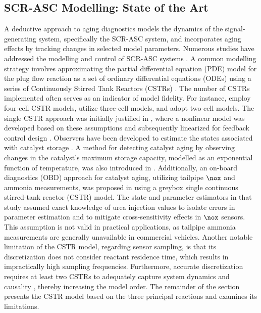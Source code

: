 \subsection{SCR-ASC Modelling: State of the Art}
A deductive approach to aging diagnostics models the dynamics of the signal-generating system, specifically the SCR-ASC
system, and incorporates aging effects by tracking changes in selected model parameters. Numerous studies have addressed
the modelling and control of SCR-ASC systems \cite{yuan2015diesel}. A common modelling strategy involves approximating
the partial differential equation (PDE) model for the plug flow reaction as a set of ordinary differential equations
(ODEs) using a series of Continuously Stirred Tank Reactors (CSTRs) \cite{hsieh2011development,nova2014urea}. The number
of CSTRs implemented often serves as an indicator of model fidelity. For instance,
\cite{chen2016estimation,ma2017observer,devarakonda2009model,hsieh2011development} employ four-cell CSTR models,
\cite{hu2018failure,hu2017improving,stadlbauer2015adaptive,schar2004control} utilize three-cell models, and
\cite{jiang2019hydrothermal,upadhyay2002modeling,devarakonda2008adequacy} adopt two-cell models. The single CSTR
approach was initially justified in \cite{devarakonda2008adequacy}, where a nonlinear model was developed based on these
assumptions and subsequently linearized for feedback control design \cite{devarakonda2009model}. Observers have been
developed to estimate the states associated with catalyst storage \cite{ma2017observer,jain2020term}. A method for
detecting catalyst aging by observing changes in the catalyst's maximum storage capacity, modelled as an exponential
function of temperature, was also introduced in \cite{ma2017observer,jiang2019hydrothermal}. Additionally, an on-board
diagnostics (OBD) approach for catalyst aging, utilizing tailpipe $\nox$ and ammonia measurements, was proposed in
\cite{jain2023diagnostics, jain2023model} using a greybox single continuous stirred-tank reactor (CSTR) model. The state
and parameter estimators in that study assumed exact knowledge of urea injection values to isolate errors in parameter
estimation and to mitigate cross-sensitivity effects in $\nox$ sensors. This assumption is not valid in practical
applications, as tailpipe ammonia measurements are generally unavailable in commercial vehicles. Another notable
limitation of the CSTR model, regarding sensor sampling, is that its discretization does not consider reactant residence
time, which results in impractically high sampling frequencies. Furthermore, accurate discretization requires at least
two CSTRs to adequately capture system dynamics and causality \cite{charla2024reduced}, thereby increasing the model
order. The remainder of the section presents the CSTR model based on the three principal reactions and examines its
limitations.

